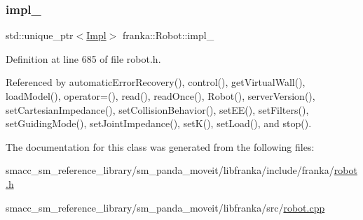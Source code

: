 \mbox{\label{classfranka_1_1Robot_aca155054184e5b6478942fd6a1b82ba4}} 
\subsubsection{\texorpdfstring{impl\+\_\+}{impl\_}}
{\footnotesize\ttfamily std\+::unique\+\_\+ptr$<$\hyperlink{classfranka_1_1Robot_1_1Impl}{Impl}$>$ franka\+::\+Robot\+::impl\+\_\+\hspace{0.3cm}{\ttfamily [private]}}



Definition at line 685 of file robot.\+h.



Referenced by automatic\+Error\+Recovery(), control(), get\+Virtual\+Wall(), load\+Model(), operator=(), read(), read\+Once(), Robot(), server\+Version(), set\+Cartesian\+Impedance(), set\+Collision\+Behavior(), set\+E\+E(), set\+Filters(), set\+Guiding\+Mode(), set\+Joint\+Impedance(), set\+K(), set\+Load(), and stop().



The documentation for this class was generated from the following files\+:\begin{DoxyCompactItemize}
\item 
smacc\+\_\+sm\+\_\+reference\+\_\+library/sm\+\_\+panda\+\_\+moveit/libfranka/include/franka/\hyperlink{robot_8h}{robot.\+h}\item 
smacc\+\_\+sm\+\_\+reference\+\_\+library/sm\+\_\+panda\+\_\+moveit/libfranka/src/\hyperlink{robot_8cpp}{robot.\+cpp}\end{DoxyCompactItemize}
